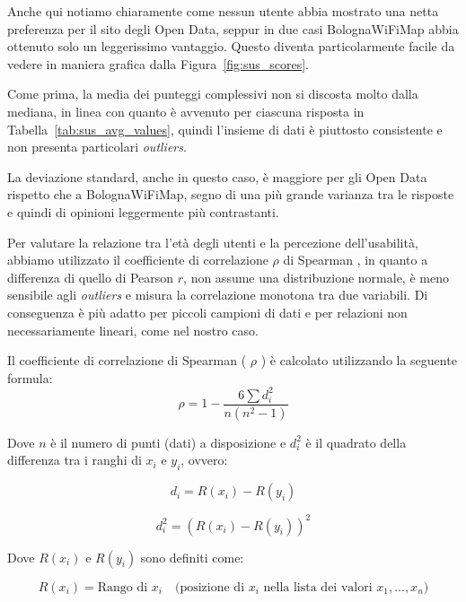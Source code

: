 Anche qui notiamo chiaramente come nessun utente abbia mostrato una netta preferenza per il sito degli Open Data, seppur in due casi BolognaWiFiMap abbia ottenuto solo un leggerissimo vantaggio. Questo diventa particolarmente facile da vedere in maniera grafica dalla Figura~\ref{fig:sus_scores}.

Come prima, la media dei punteggi complessivi non si discosta molto dalla mediana, in linea con quanto è avvenuto per ciascuna risposta in Tabella~\ref{tab:sus_avg_values}, quindi l'insieme di dati è piuttosto consistente e non presenta particolari \textit{outliers}.

La deviazione standard, anche in questo caso, è maggiore per gli Open Data rispetto che a BolognaWiFiMap, segno di una più grande varianza tra le risposte e quindi di opinioni leggermente più contrastanti.

Per valutare la relazione tra l'età degli utenti e la percezione dell'usabilità, abbiamo utilizzato il coefficiente di correlazione \( \rho \) di Spearman , in quanto a differenza di quello di Pearson \( r \), non assume una distribuzione normale, è meno sensibile agli \textit{outliers} e misura la correlazione monotona tra due variabili. Di conseguenza è più adatto per piccoli campioni di dati e per relazioni non necessariamente lineari, come nel nostro caso.

Il coefficiente di correlazione di Spearman ( \( \rho \) ) è calcolato utilizzando la seguente formula:
\begin{equation}
    \rho = 1 - \frac{6 \sum d_i^2}{n(n^2 - 1)}
    \label{eq:spearman_correlation_coefficient}
\end{equation}

Dove \( n \) è il numero di punti (dati) a disposizione e \( d_i^2 \) è il quadrato della differenza tra i ranghi di \( x_i \) e \( y_i \), ovvero:

\begin{equation}
    d_i = R(x_i) - R(y_i)
    \label{eq:rank_difference}
\end{equation}

\begin{equation}
    d_i^2 = (R(x_i) - R(y_i))^2
    \label{eq:squared_rank_difference}
\end{equation}

Dove \( R(x_i) \) e \( R(y_i) \) sono definiti come:

\begin{equation}
    R(x_i) = \text{Rango di } x_i \quad \text{(posizione di } x_i \text{ nella lista dei valori } x_1, ..., x_n \text{)}
    \label{eq:rank_x}
\end{equation}

